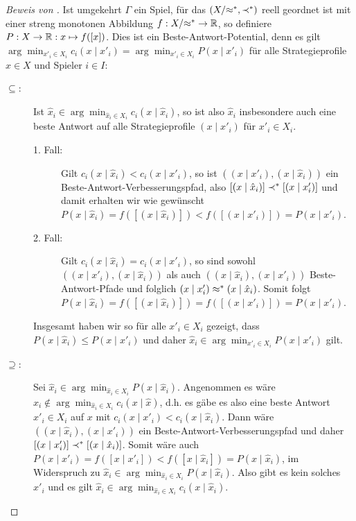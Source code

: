\begin{proof}[Beweis von ]
	Ist umgekehrt $\Gamma$ ein Spiel, für das $(X/{\approx^\ast}, \prec^\ast)$ reell geordnet ist mit einer streng monotonen Abbildung $f: X/{\approx^\ast} \to \mathbb{R}$, so definiere $P: X \to \mathbb{R}: x \mapsto f([x])$. Dies ist ein Beste-Antwort-Potential, denn es gilt $\arg \min_{x'_i \in X_i}c_i(x \mid x'_i) = \arg \min_{x'_i \in X_i} P(x \mid x'_i)$ für alle Strategieprofile $x \in X$ und Spieler $i \in I$:
	\begin{description}
		\item[\glqq$\bm{\subseteq}$\grqq:] Ist $\hat{x}_i \in \arg \min_{\hat{x}_i \in X_i}c_i(x \mid \hat{x}_i)$, so ist also $\hat{x}_i$ insbesondere auch eine beste Antwort auf alle Strategieprofile $(x \mid x'_i)$ für $x'_i \in X_i$.
			\begin{description}
				\item[1. Fall:] Gilt $c_i(x \mid \hat{x}_i) < c_i(x \mid x'_i)$, so ist $((x \mid x'_i), (x \mid \hat{x}_i))$ ein Beste-Antwort-Verbesserungspfad, also $[(x \mid \hat{x}_i)] \prec^\ast [(x \mid x'_i)]$ und damit erhalten wir wie gewünscht $P(x \mid \hat{x}_i) = f([(x \mid \hat{x}_i)]) < f ([(x \mid x'_i)]) = P(x \mid x'_i)$.
				\item[2. Fall:] Gilt $c_i(x \mid \hat{x}_i) = c_i(x \mid x'_i)$, so sind sowohl $((x \mid x'_i), (x \mid \hat{x}_i))$ als auch $((x \mid \hat{x}_i), (x \mid x'_i))$ Beste-Antwort-Pfade und folglich $(x \mid x'_i) \approx^\ast (x \mid \hat{x}_i)$. Somit folgt $P(x \mid \hat{x}_i) = f([(x \mid \hat{x}_i)]) = f([(x \mid x'_i)]) = P(x \mid x'_i)$.
			\end{description}
			Insgesamt haben wir so für alle $x'_i \in X_i$ gezeigt, dass $P(x \mid \hat{x}_i) \leq P(x \mid x'_i)$ und daher $\hat{x}_i \in \arg \min_{x'_i \in X_i} P(x \mid x'_i)$ gilt.
		\item[\glqq$\bm{\supseteq}$\grqq:] Sei $\hat{x}_i \in \arg \min_{\hat{x}_i \in X_i}P(x \mid \hat{x}_i)$. Angenommen es wäre $\hat{x}_i \notin \arg \min_{\hat{x}_i \in X_i}c_i(x \mid \hat{x})$, d.h. es gäbe es also eine beste Antwort $x'_i \in X_i$ auf $x$ mit $c_i(x \mid x'_i) < c_i(x \mid \hat{x}_i)$. Dann wäre $((x \mid \hat{x}_i), (x \mid x'_i))$ ein Beste-Antwort-Verbesserungspfad und daher $[(x \mid x'_i)] \prec^\ast [(x \mid \hat{x}_i)]$. Somit wäre auch $P(x \mid x'_i) = f([x \mid x'_i]) < f([x \mid \hat{x}_i]) = P(x \mid \hat{x}_i)$, im Widerspruch zu $\hat{x}_i \in \arg \min_{\hat{x}_i \in X_i}P(x \mid \hat{x}_i)$. Also gibt es kein solches $x'_i$ und es gilt $\hat{x}_i \in \arg \min_{\hat{x}_i \in X_i}c_i(x \mid \hat{x}_i)$. \qedhere
	\end{description}
\end{proof}

